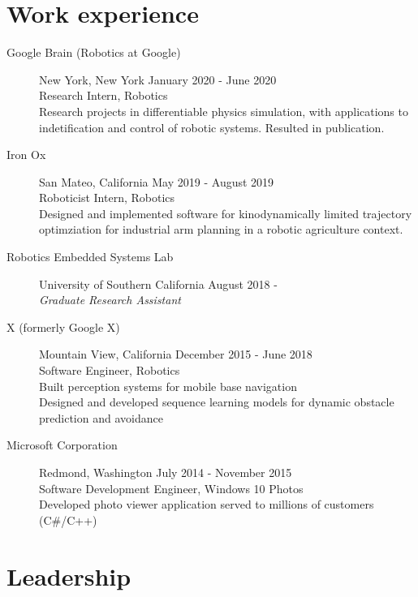 \documentclass{article}
\begin{document}
\printbibliography[title=Publications]

\section*{Work experience}

\begin{description}
\item[Google Brain (Robotics at Google)]
    New York, New York \hfill January 2020 - June 2020\\
    Research Intern, Robotics\\
    Research projects in differentiable physics simulation, with applications to indetification and control of robotic systems. Resulted in publication.

\item[Iron Ox]
    San Mateo, California \hfill May 2019 - August 2019\\
    Roboticist Intern, Robotics\\
    Designed and implemented software for kinodynamically limited trajectory optimziation for industrial arm planning in a robotic agriculture context.

\item[Robotics Embedded Systems Lab] University of Southern California \hfill August 2018 - \\
\emph{Graduate Research Assistant}

\item[X (formerly Google X)]
    Mountain View, California \hfill December 2015 - June 2018\\
    Software Engineer, Robotics\\
    Built perception systems for mobile base navigation\\
    Designed and developed sequence learning models for dynamic obstacle prediction and avoidance
    
\item[Microsoft Corporation]
    Redmond, Washington \hfill July 2014 - November 2015\\
    Software Development Engineer, Windows 10 Photos\\
    Developed photo viewer application served to millions of customers (C\#/C++)
\end{description}

\section*{Leadership}
\end{document}

